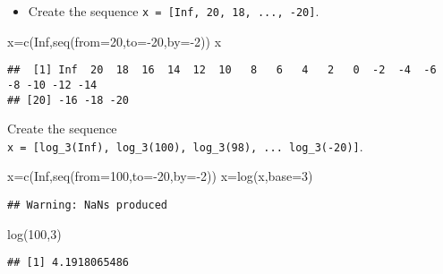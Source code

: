\documentclass[
]{article}
\newenvironment{Shaded}{\begin{snugshade}}{\end{snugshade}}
\newcommand{\AttributeTok}[1]{\textcolor[rgb]{0.77,0.63,0.00}{#1}}
\newcommand{\ConstantTok}[1]{\textcolor[rgb]{0.00,0.00,0.00}{#1}}
\newcommand{\DecValTok}[1]{\textcolor[rgb]{0.00,0.00,0.81}{#1}}
\newcommand{\FunctionTok}[1]{\textcolor[rgb]{0.00,0.00,0.00}{#1}}
\newcommand{\NormalTok}[1]{#1}
\newcommand{\OtherTok}[1]{\textcolor[rgb]{0.56,0.35,0.01}{#1}}
\newcommand{\SpecialCharTok}[1]{\textcolor[rgb]{0.00,0.00,0.00}{#1}}
\providecommand{\tightlist}{%
  \setlength{\itemsep}{0pt}\setlength{\parskip}{0pt}}
\begin{document}
\begin{itemize}
\tightlist
\item
  Create the sequence \texttt{x\ =\ {[}Inf,\ 20,\ 18,\ ...,\ -20{]}}.
\end{itemize}

\begin{Shaded}
\begin{Highlighting}[]
\NormalTok{x}\OtherTok{=}\FunctionTok{c}\NormalTok{(}\ConstantTok{Inf}\NormalTok{,}\FunctionTok{seq}\NormalTok{(}\AttributeTok{from=}\DecValTok{20}\NormalTok{,}\AttributeTok{to=}\SpecialCharTok{{-}}\DecValTok{20}\NormalTok{,}\AttributeTok{by=}\SpecialCharTok{{-}}\DecValTok{2}\NormalTok{))}
\NormalTok{x}
\end{Highlighting}
\end{Shaded}

\begin{verbatim}
##  [1] Inf  20  18  16  14  12  10   8   6   4   2   0  -2  -4  -6  -8 -10 -12 -14
## [20] -16 -18 -20
\end{verbatim}

Create the sequence
\texttt{x\ =\ {[}log\_3(Inf),\ log\_3(100),\ log\_3(98),\ ...\ log\_3(-20){]}}.

\begin{Shaded}
\begin{Highlighting}[]
\NormalTok{x}\OtherTok{=}\FunctionTok{c}\NormalTok{(}\ConstantTok{Inf}\NormalTok{,}\FunctionTok{seq}\NormalTok{(}\AttributeTok{from=}\DecValTok{100}\NormalTok{,}\AttributeTok{to=}\SpecialCharTok{{-}}\DecValTok{20}\NormalTok{,}\AttributeTok{by=}\SpecialCharTok{{-}}\DecValTok{2}\NormalTok{))}
\NormalTok{x}\OtherTok{=}\FunctionTok{log}\NormalTok{(x,}\AttributeTok{base=}\DecValTok{3}\NormalTok{)}
\end{Highlighting}
\end{Shaded}

\begin{verbatim}
## Warning: NaNs produced
\end{verbatim}

\begin{Shaded}
\begin{Highlighting}[]
\FunctionTok{log}\NormalTok{(}\DecValTok{100}\NormalTok{,}\DecValTok{3}\NormalTok{)}
\end{Highlighting}
\end{Shaded}

\begin{verbatim}
## [1] 4.1918065486
\end{verbatim}
\end{document}

